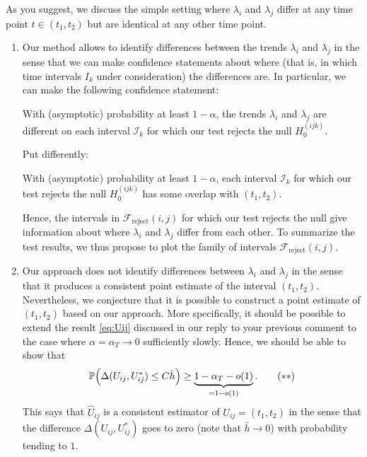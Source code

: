 \documentclass[a4paper,12pt]{article}
\begin{document}
\begin{enumerate}[label=(\arabic*),leftmargin=0.7cm]
As you suggest, we discuss the simple setting where $\lambda_i$ and $\lambda_j$ differ at any time point $t \in (t_1,t_2)$ but are identical at any other time point.
\begin{enumerate}[label=(\roman*),leftmargin=0.75cm]

\item Our method allows to identify differences between the trends $\lambda_i$ and $\lambda_j$ in the sense that we can make confidence statements about where (that is, in which time intervals $I_k$ under consideration) the differences are. In particular, we can make the following confidence statement: 
\vspace{0.1cm}

\begin{center}
\begin{minipage}{0.8\textwidth}
With (asymptotic) probability at least $1-\alpha$, the trends $\lambda_i$ and $\lambda_j$ are different on each interval $\mathcal{I}_k$ for which our test rejects the null $H_0^{(ijk)}$.
\end{minipage}
\end{center} 
\vspace{0.1cm}

Put differently:
\vspace{0.1cm}

\begin{center}
\begin{minipage}{0.8\textwidth}
With (asymptotic) probability at least $1-\alpha$, each interval $\mathcal{I}_k$ for which our test rejects the null $H_0^{(ijk)}$ has some overlap with $(t_1,t_2)$.
\end{minipage}
\end{center}
\vspace{0.1cm}

Hence, the intervals in $\mathcal{F}_{\text{reject}}(i,j)$ for which our test rejects the null give information about where $\lambda_i$ and $\lambda_j$ differ from each other. To summarize the test results, we thus propose to plot the family of intervals $\mathcal{F}_{\text{reject}}(i,j)$. 

\item Our approach does not identify differences between $\lambda_i$ and $\lambda_j$ in the sense that it produces a consistent point estimate of the interval $(t_1,t_2)$. Nevertheless, we conjecture that it is possible to construct a point estimate of $(t_1,t_2)$ based on our approach. More specifically, it should be possible to extend the result \eqref{eq:Uij} discussed in our reply to your previous comment to the case where $\alpha = \alpha_T \to 0$ sufficiently slowly. Hence, we should be able to show that 
\begin{equation}\label{eq:Uij-conjecture}
\mathbb{P} \Big( \Delta(U_{ij}, U_{ij}^*) \le C \bar{h} \Big) \ge \underbrace{1-\alpha_T - o(1)}_{= 1 - o(1)}. \tag{$**$}
\end{equation}
This says that $\hat{U}_{ij}$ is a consistent estimator of $U_{ij} = (t_1,t_2)$ in the sense that the difference $\Delta(U_{ij}, U_{ij}^*)$ goes to zero (note that $\bar{h} \to 0$) with probability tending to $1$. 
\end{enumerate}


\end{enumerate}
\end{document}
